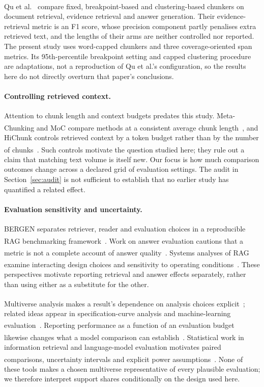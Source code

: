 \documentclass[11pt]{article}
\newcommand{\citeL}[1]{\cite{#1}\textsuperscript{\textcolor{red}{\dag}}}
\begin{document}
Qu et al.~\citeL{qu2025semanticchunking} compare fixed, breakpoint-based and clustering-based chunkers on document
retrieval, evidence retrieval and answer generation. Their evidence-retrieval metric is an F1 score, whose precision
component partly penalises extra retrieved text, and the lengths of their arms are neither controlled nor reported.
The present study uses word-capped chunkers and three coverage-oriented span metrics. Its 95th-percentile breakpoint
setting and capped clustering procedure are adaptations, not a reproduction of Qu et al.'s configuration, so the
results here do not directly overturn that paper's conclusions.

\paragraph{Controlling retrieved context.}
Attention to chunk length and context budgets predates this study. Meta-Chunking and MoC compare methods at a
consistent average chunk length~\citeL{metachunking2024,moc2025}, and HiChunk controls retrieved context by a token
budget rather than by the number of chunks~\citeL{hichunk2025}. Such controls motivate the question studied here; they
rule out a claim that matching text volume is itself new. Our focus is how much comparison outcomes change across a
declared grid of evaluation settings. The audit in Section~\ref{sec:audit} is not sufficient to establish that no
earlier study has quantified a related effect.

\paragraph{Evaluation sensitivity and uncertainty.}
BERGEN separates retriever, reader and evaluation choices in a reproducible RAG benchmarking
framework~\citeL{rau2024bergen}. Work on answer evaluation cautions that a metric is not a complete account of answer
quality~\citeL{kamalloo2023evaluating}. Systems analyses of RAG examine interacting design choices and sensitivity to
operating conditions~\citeL{muthyam2026ragstability,zhao2026ragdesign}. These perspectives motivate reporting
retrieval and answer effects separately, rather than using either as a substitute for the other.

Multiverse analysis makes a result's dependence on analysis choices explicit~\citeL{steegen2016multiverse}; related
ideas appear in specification-curve analysis and machine-learning
evaluation~\citeL{simonsohn2020speccurve,bell2022multiverse}. Reporting performance as a function of an evaluation
budget likewise changes what a model comparison can establish~\citeL{dodge2019showyourwork}. Statistical work in
information retrieval and language-model evaluation motivates paired comparisons, uncertainty intervals and explicit
power assumptions~\citeL{smucker2007sigtests,urbano2019sigtesting,miller2024errorbars}. None of these tools makes a
chosen multiverse representative of every plausible evaluation; we therefore interpret support shares conditionally on
the design used here.
\end{document}
